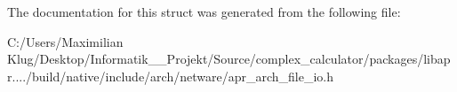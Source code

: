 The documentation for this struct was generated from the following file\+:\begin{DoxyCompactItemize}
\item 
C\+:/\+Users/\+Maximilian Klug/\+Desktop/\+Informatik\+\_\+\_\+\+Projekt/\+Source/complex\+\_\+calculator/packages/libapr..../build/native/include/arch/netware/apr\+\_\+arch\+\_\+file\+\_\+io.\+h\end{DoxyCompactItemize}
